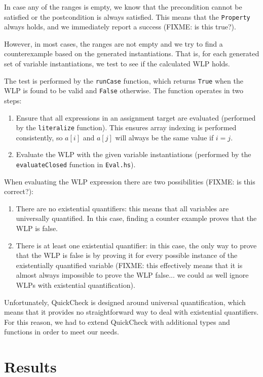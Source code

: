 \documentclass[a4paper]{article}
\begin{document}
In case any of the ranges is empty, we know that the precondition cannot be
satisfied or the postcondition is always satisfied. This means that the
\texttt{Property} always holds, and we immediately report a success (FIXME: is this true?).

However, in most cases, the ranges are not empty and we try to find a counterexample
based on the generated instantiations. That is, for each generated set of variable
instantiations, we test to see if the calculated WLP holds.

The test is performed by the \texttt{runCase} function, which returns \texttt{True}
when the WLP is found to be valid and \texttt{False} otherwise. The function
operates in two steps:

\begin{enumerate}
\item Ensure that all expressions in an assignment target are evaluated (performed
by the \texttt{literalize} function). This ensures array indexing is performed
consistently, so $a[i]$ and $a[j]$ will always be the same value if $i = j$.
\item Evaluate the WLP with the given variable instantiations (performed by the
\texttt{evaluateClosed} function in \texttt{Eval.hs}).
\end{enumerate}

When evaluating the WLP expression there are two possibilities (FIXME: is this correct?):

\begin{enumerate}
\item There are no existential quantifiers: this means that all variables are
universally quantified. In this case, finding a counter example proves that
the WLP is false.
\item There is at least one existential quantifier: in this case, the only way
to prove that the WLP is false is by proving it for every possible instance of
the existentially quantified variable (FIXME: this effectively means that it is
almost always impossible to prove the WLP false... we could as well ignore WLPs
with existential quantification).
\end{enumerate}

Unfortunately, QuickCheck is designed around universal quantification, which means
that it provides no straightforward way to deal with existential quantifiers.
For this reason, we had to extend QuickCheck with additional types and functions
in order to meet our needs.

\section{Results}
\end{document}
